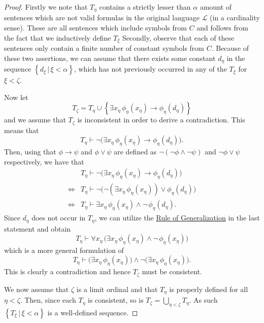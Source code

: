 \documentclass[../../main.tex]{subfiles}
\begin{document}
\begin{proof}
    Firstly we note that $T_\eta$ contains a strictly lesser than $\alpha$ amount of sentences which are not valid formulas in the original language $\mathcal{L}$ (in a cardinality sense).
    These are all sentences which include symbols from $C$ and follows from the fact that we inductively define $T_\xi$ 
    Secondly, observe that each of these sentences only contain a finite number of constant symbols from $C$.
    Because of these two assertions, we can assume that there exists some constant $d_\eta$ in the sequence $\left\{d_\xi \, \vert \, \xi < \alpha\right\}$,
    which has not previously occurred in any of the $T_\xi$ for $\xi < \zeta$.

    Now let 
    $$T_\zeta = T_\eta \cup \left\{\exists x_\eta \, \phi_\eta(x_\eta) \rightarrow \phi_\eta(d_\eta)\right\}$$
    and we assume that $T_\zeta$ is inconsistent in order to derive a contradiction.
    This means that $$T_\eta \vdash \lnot \big(\exists x_\eta \, \phi_\eta(x_\eta) \rightarrow \phi_\eta(d_\eta)\big).$$
    Then, using that $\phi \rightarrow \psi$ and $\phi \vee \psi$ are defined as $\lnot \left(\lnot \phi \wedge \lnot \psi\right)$ and $\lnot \phi \vee \psi$ respectively,
    we have that
    \begin{align*}
             & T_\eta \vdash \lnot \big(\exists x_\eta \, \phi_\eta(x_\eta) \rightarrow \phi_\eta(d_\eta)\big) \\
        \iff & T_\eta \vdash \lnot \big(\lnot\left(\exists x_\eta \, \phi_\eta(x_\eta)\right) \vee \phi_\eta(d_\eta)\big) \\
        \iff & T_\eta \vdash \exists x_\eta \, \phi_\eta(x_\eta) \wedge \lnot \, \phi_\eta(d_\eta).
    \end{align*}
    Since $d_\eta$ does not occur in $T_\eta$, we can utilize the \hyperref[generalization-rule]{Rule of Generalization} in the last statement and obtain 
    $$T_\eta \vdash \forall x_\eta \, \big(\exists x_\eta \, \phi_\eta(x_\eta) \wedge \lnot \, \phi_\eta(x_\eta)\big)$$
    which is a more general formulation of 
    $$T_\eta \vdash \big(\exists x_\eta \, \phi_\eta(x_\eta)\big) \wedge \lnot \big(\exists x_\eta \, \phi_\eta(x_\eta)\big).$$
    This is clearly a contradiction and hence $T_\zeta$ must be consistent.

    We now assume that $\zeta$ is a limit ordinal and that $T_\eta$ is properly defined for all $\eta <\zeta$.
    Then, since each $T_\eta$ is consistent, so is $T_\zeta = \bigcup_{\eta < \zeta} T_\eta$.
    As such $\left\{T_\xi \, \vert \, \xi < \alpha\right\}$ is a well-defined sequence.


\end{proof}
\end{document}
